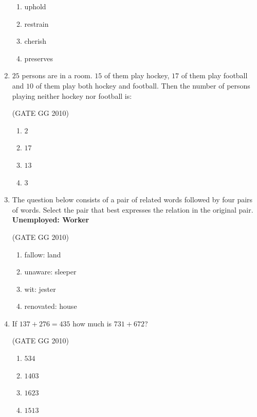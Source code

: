 \documentclass[journal]{IEEEtran}
\begin{document}
\begin{enumerate}[start=26]
\begin{enumerate}
    \item  uphold
\item  restrain
\item  cherish
\item  preserves
\end{enumerate}

\item $25$ persons are in a room. $15$ of them play hockey, $17$ of them play football and $10$ of them play both hockey and football. Then the number of persons playing neither hockey nor football is:

\hfill (GATE GG 2010) 
\begin{multicols}{4}

\begin{enumerate}
\item  $2$
\item  $17$
\item  $13$
\item  $3$
\end{enumerate}
\end{multicols}

\item The question below consists of a pair of related words followed by four pairs of words. Select the pair that best expresses the relation in the original pair.
\textbf{Unemployed: Worker}

\hfill (GATE GG 2010) 

\begin{enumerate}

    \item  fallow: land
\item  unaware: sleeper
\item  wit: jester
\item  renovated: house
\end{enumerate}

\item If $137 +276 = 435$ how much is $731 + 672$?

\hfill (GATE GG 2010) 
\begin{multicols}{4}

\begin{enumerate}
    \item  $534$
\item  $1403$
\item  $1623$
\item  $1513$
\end{enumerate}
\end{multicols}


\end{enumerate}
\end{document}
